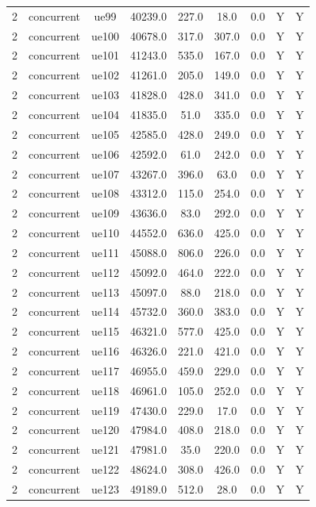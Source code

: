 \begin{table}[ht]
\begin{tabular}{|c|c|c|c|c|c|c|c|c|}
2 & concurrent & ue99 & 40239.0 & 227.0 & 18.0 & 0.0 & Y & Y \\
2 & concurrent & ue100 & 40678.0 & 317.0 & 307.0 & 0.0 & Y & Y \\
2 & concurrent & ue101 & 41243.0 & 535.0 & 167.0 & 0.0 & Y & Y \\
2 & concurrent & ue102 & 41261.0 & 205.0 & 149.0 & 0.0 & Y & Y \\
2 & concurrent & ue103 & 41828.0 & 428.0 & 341.0 & 0.0 & Y & Y \\
2 & concurrent & ue104 & 41835.0 & 51.0 & 335.0 & 0.0 & Y & Y \\
2 & concurrent & ue105 & 42585.0 & 428.0 & 249.0 & 0.0 & Y & Y \\
2 & concurrent & ue106 & 42592.0 & 61.0 & 242.0 & 0.0 & Y & Y \\
2 & concurrent & ue107 & 43267.0 & 396.0 & 63.0 & 0.0 & Y & Y \\
2 & concurrent & ue108 & 43312.0 & 115.0 & 254.0 & 0.0 & Y & Y \\
2 & concurrent & ue109 & 43636.0 & 83.0 & 292.0 & 0.0 & Y & Y \\
2 & concurrent & ue110 & 44552.0 & 636.0 & 425.0 & 0.0 & Y & Y \\
2 & concurrent & ue111 & 45088.0 & 806.0 & 226.0 & 0.0 & Y & Y \\
2 & concurrent & ue112 & 45092.0 & 464.0 & 222.0 & 0.0 & Y & Y \\
2 & concurrent & ue113 & 45097.0 & 88.0 & 218.0 & 0.0 & Y & Y \\
2 & concurrent & ue114 & 45732.0 & 360.0 & 383.0 & 0.0 & Y & Y \\
2 & concurrent & ue115 & 46321.0 & 577.0 & 425.0 & 0.0 & Y & Y \\
2 & concurrent & ue116 & 46326.0 & 221.0 & 421.0 & 0.0 & Y & Y \\
2 & concurrent & ue117 & 46955.0 & 459.0 & 229.0 & 0.0 & Y & Y \\
2 & concurrent & ue118 & 46961.0 & 105.0 & 252.0 & 0.0 & Y & Y \\
2 & concurrent & ue119 & 47430.0 & 229.0 & 17.0 & 0.0 & Y & Y \\
2 & concurrent & ue120 & 47984.0 & 408.0 & 218.0 & 0.0 & Y & Y \\
2 & concurrent & ue121 & 47981.0 & 35.0 & 220.0 & 0.0 & Y & Y \\
2 & concurrent & ue122 & 48624.0 & 308.0 & 426.0 & 0.0 & Y & Y \\
2 & concurrent & ue123 & 49189.0 & 512.0 & 28.0 & 0.0 & Y & Y \\

\end{tabular}
\end{table}
